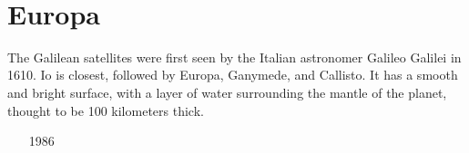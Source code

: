 \begin{small}
\begin{itemize}
\item[\twothousandone] 
\item[\twothousandtwelve] 
\item[\twothousandseventeen] 
\item[\twothousandnineteen] 
\item[\twothousandtwenty] 
\item[\twothousandtwentyone]
 \\ 
\item[\twothousandtwentythree]
\end{itemize}
\end{small}

\section{Europa}

The Galilean satellites were first seen by the Italian astronomer 
Galileo Galilei in 1610. Io is closest, followed by Europa, Ganymede, 
and Callisto. It has a smooth and bright surface, with a layer of 
water surrounding the mantle of the planet, thought to be 100 kilometers thick.

\begin{small}
\begin{itemize}
\item[1986]
\item[\twothousandtwo] 
\item[\twothousandfour] 
\item[\twothousandfive] 
\\ 
\\ 
\item[\twothousandeight] 
\item[\twothousandten] 
\item[\twothousandeleven] 
\item[\twothousandfourteen] 
 \\
\item[\twothousandnineteen] 
\item[\twothousandtwentyone] 
\item[\twothousandtwentytwo] 
\end{itemize}
\end{small}



